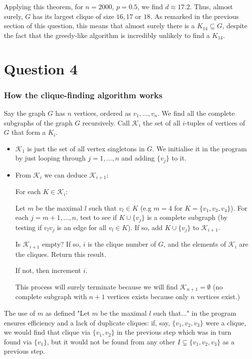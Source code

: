 \documentclass{article}
\begin{document}
Applying this theorem, for $n=2000$, $p=0.5$, we find $d \approx 17.2$. Thus, almost surely, $G$ has its largest clique of size $16, 17$ or $ 18$. As remarked in the previous section of this question, this means that almost surely there is a $K_{14} \subseteq G$, despite the fact that the greedy-like algorithm is incredibly unlikely to find a $K_{14}$.

\section{Question 4}

\subsubsection{How the clique-finding algorithm works}

Say the graph $G$ has $n$ vertices, ordered as $v_1, \dots, v_n$. We find all the complete subgraphs of the graph $G$ recursively. Call $\mathcal{K}_i$ the set of all $i$-tuples of vertices of $G$ that form a $K_i$.

\begin{itemize}
	\item $\mathcal{K}_1$ is just the set of all vertex singletons in $G$. We initialise it in the program by just looping through $j=1, \dots, n$ and adding $\{ v_j\}$ to it.
	
	\item From $\mathcal{K}_i$ we can deduce $\mathcal{K}_{i+1}$:
	
	\subitem For each $K \in \mathcal{K}_i$:
	
	\subsubitem Let $m$ be the maximal $l$ such that $v_l \in K$ (e.g $m=4$ for $K = \{v_1, v_3, v_4\}$). For each $j = m+1, \dots, n$, test to see if $K \cup \{ v_j\}$ is a complete subgraph (by testing if $v_l v_j$ is an edge for all $v_l \in K$). If so, add $K \cup \{ v_j\}$ to $\mathcal{K}_{i+1}$.
	
	\subitem Is $\mathcal{K}_{i+1}$ empty? If so, $i$ is the clique number of $G$, and the elements of $\mathcal{K}_{i}$ are the cliques. Return this result.
	
	\subitem If not, then increment $i$.
	
	\subsubitem This process will surely terminate because we will find $\mathcal{K}_{n+1} = \emptyset$ (no complete subgraph with $n+1$ vertices exists because only $n$ vertices exist.)
\end{itemize}

The use of $m$ as defined "Let $m$ be the maximal $l$ such that..." in the program ensures efficiency and a lack of duplicate cliques: if, say, $\{ v_1, v_2, v_3\}$ were a clique, we would find that clique via $\{ v_1, v_2\}$ in the previous step which was in turn found via $\{ v_1\}$, but it would not be found from any other $I \subsetneq \{ v_1, v_2, v_3\}$ as a previous step.
\end{document}
